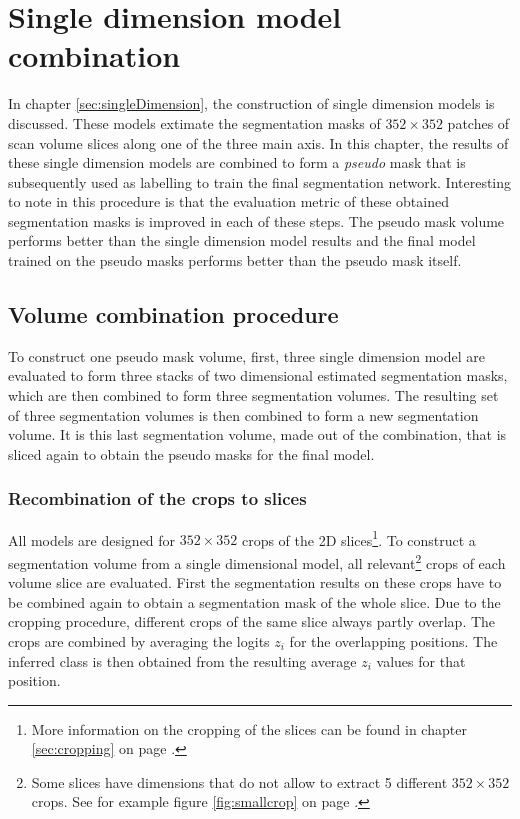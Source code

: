 \chapter{Single dimension model combination\label{sec:combination}}
In chapter \ref{sec:singleDimension}, the construction of single dimension models is discussed.
These models extimate the segmentation masks of $352\times 352$ patches of scan volume slices along one of the three main axis.
In this chapter, the results of these single dimension models are combined to form a \textit{pseudo} mask that is subsequently used as labelling to train the final segmentation network.
Interesting to note in this procedure is that the evaluation metric of these obtained segmentation masks is improved in each of these steps.
The pseudo mask volume performs better than the single dimension model results and the final model trained on the pseudo masks performs better than the pseudo mask itself. 

\section{Volume combination procedure}
To construct one pseudo mask volume, first, three single dimension model are evaluated to form three stacks of two dimensional estimated segmentation masks, which are then combined to form three segmentation volumes. 
The resulting set of three segmentation volumes is then combined to form a new segmentation volume.
It is this last segmentation volume, made out of the combination, that is sliced again to obtain the pseudo masks for the final model.

\subsection{Recombination of the crops to slices}
All models are designed for $352 \times 352$ crops of the 2D slices\footnote{More information on the cropping of the slices can be found in chapter \ref{sec:cropping} on page \pageref{sec:cropping}.}.
To construct a segmentation volume from a single dimensional model, all relevant\footnote{Some slices have dimensions that do not allow to extract 5 different $352 \times 352$ crops. See for example figure \ref{fig:smallcrop} on page \pageref{fig:smallcrop}.} crops of each volume slice are evaluated.
First the segmentation results on these crops have to be combined again to obtain a segmentation mask of the whole slice.
Due to the cropping procedure, different crops of the same slice always partly overlap.
The crops are combined by averaging the logits $z_i$ for the overlapping positions.
The inferred class is then obtained from the resulting average $z_i$ values for that position. 

